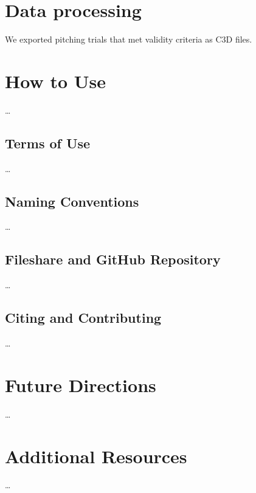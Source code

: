 \documentclass[
]{article}
\begin{document}
\hypertarget{data-processing}{%
\section{Data processing}\label{data-processing}}

We exported pitching trials that met validity criteria as C3D files.

\hypertarget{how-to-use}{%
\section{How to Use}\label{how-to-use}}

\ldots{}

\hypertarget{terms-of-use}{%
\subsection{Terms of Use}\label{terms-of-use}}

\ldots{}

\hypertarget{naming-conventions}{%
\subsection{Naming Conventions}\label{naming-conventions}}

\ldots{}

\hypertarget{fileshare-and-github-repository}{%
\subsection{Fileshare and GitHub Repository}\label{fileshare-and-github-repository}}

\ldots{}

\hypertarget{citing-and-contributing}{%
\subsection{Citing and Contributing}\label{citing-and-contributing}}

\ldots{}

\hypertarget{future-directions}{%
\section{Future Directions}\label{future-directions}}

\ldots{}

\hypertarget{additional-resources}{%
\section{Additional Resources}\label{additional-resources}}

\ldots{}

\newpage
\singlespacing
{}


\end{document}
